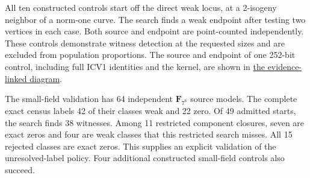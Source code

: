 \documentclass[11pt]{article}
\newcommand{\F}{\mathbf F}
\begin{document}
\begin{center}
\end{center}

All ten constructed controls start off the direct weak locus, at a
2-isogeny neighbor of a norm-one curve. The search finds a weak endpoint
after testing two vertices in each case. Both source and endpoint are
point-counted independently. These controls demonstrate witness detection
at the requested sizes and are excluded from population proportions.
The source and endpoint of one 252-bit control, including full ICV1
identities and the kernel, are shown in
\href{verified_control.svg}{the evidence-linked diagram}.

The small-field validation has 64 independent $\F_{7^6}$ source models.
The complete exact census labels 42 of their classes weak and 22 zero.
Of 49 admitted starts, the search finds 38 witnesses. Among 11 restricted
component closures, seven are exact zeros and four are weak classes that
this restricted search misses. All 15 rejected classes are exact zeros.
This supplies an explicit validation of the unresolved-label policy.
Four additional constructed small-field controls also succeed.
\end{document}
